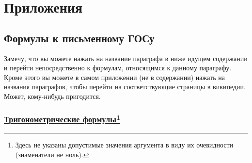 \part{Приложения}



\renewcommand*{\arraystretch}{1.85}

\everymath{\displaystyle}



\resetHeadWidth

\hypersetup{linkcolor = black, urlcolor = black} 

\chapter[Формулы к письменному ГОСу]{Формулы к письменному ГОСу}

Замечу, что вы можете нажать на название параграфа в ниже идущем содержании и перейти непосредственно к формулам, относящимся к данному параграфу. Кроме этого вы можете в самом приложении (не в содержании) нажать на названия параграфов, чтобы перейти на соответствующие страницы в википедии. Может, кому-нибудь пригодится. 

\renewcommand{\mtcfont}{\normalsize}
\renewcommand{\mtcSfont}{\small}
\minitoc

\newpage
\section[Тригонометрические формулы]{\protect\href{https://ru.wikipedia.org/wiki/\%D0\%A2\%D1\%80\%D0\%B8\%D0\%B3\%D0\%BE\%D0\%BD\%D0\%BE\%D0\%BC\%D0\%B5\%D1\%82\%D1\%80\%D0\%B8\%D1\%87\%D0\%B5\%D1\%81\%D0\%BA\%D0\%B8\%D0\%B5_\%D1\%84\%D1\%83\%D0\%BD\%D0\%BA\%D1\%86\%D0\%B8\%D0\%B8}{Тригонометрические формулы}\footnote{Здесь не указаны допустимые значения аргумента в виду их очевидности (знаменатели не ноль).}}

